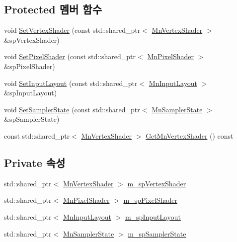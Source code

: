 \subsection*{Protected 멤버 함수}
\begin{DoxyCompactItemize}
\item 
void \hyperlink{class_m_n_l_1_1_mn_shader_path_ace035d94a5fccba00c4a52e48f5b26d2}{Set\+Vertex\+Shader} (const std\+::shared\+\_\+ptr$<$ \hyperlink{class_m_n_l_1_1_mn_vertex_shader}{Mn\+Vertex\+Shader} $>$ \&sp\+Vertex\+Shader)
\item 
void \hyperlink{class_m_n_l_1_1_mn_shader_path_a48f8dd4814bc4232d4f999502cf4fb98}{Set\+Pixel\+Shader} (const std\+::shared\+\_\+ptr$<$ \hyperlink{class_m_n_l_1_1_mn_pixel_shader}{Mn\+Pixel\+Shader} $>$ \&sp\+Pixel\+Shader)
\item 
void \hyperlink{class_m_n_l_1_1_mn_shader_path_a712673a10cf0eeba9ac5a3012aa2fb80}{Set\+Input\+Layout} (const std\+::shared\+\_\+ptr$<$ \hyperlink{class_m_n_l_1_1_mn_input_layout}{Mn\+Input\+Layout} $>$ \&sp\+Input\+Layout)
\item 
void \hyperlink{class_m_n_l_1_1_mn_shader_path_af646c4494b19a405efdae6fd6d4fad8c}{Set\+Sampler\+State} (const std\+::shared\+\_\+ptr$<$ \hyperlink{class_m_n_l_1_1_mn_sampler_state}{Mn\+Sampler\+State} $>$ \&sp\+Sampler\+State)
\item 
const std\+::shared\+\_\+ptr$<$ \hyperlink{class_m_n_l_1_1_mn_vertex_shader}{Mn\+Vertex\+Shader} $>$ \hyperlink{class_m_n_l_1_1_mn_shader_path_ab420805bf815e0b4d7910323ea3c08ad}{Get\+Mn\+Vertex\+Shader} () const
\end{DoxyCompactItemize}
\subsection*{Private 속성}
\begin{DoxyCompactItemize}
\item 
std\+::shared\+\_\+ptr$<$ \hyperlink{class_m_n_l_1_1_mn_vertex_shader}{Mn\+Vertex\+Shader} $>$ \hyperlink{class_m_n_l_1_1_mn_shader_path_a5cabf2617966090ed953812d48fb157d}{m\+\_\+sp\+Vertex\+Shader}
\item 
std\+::shared\+\_\+ptr$<$ \hyperlink{class_m_n_l_1_1_mn_pixel_shader}{Mn\+Pixel\+Shader} $>$ \hyperlink{class_m_n_l_1_1_mn_shader_path_a8881dffb70fdbfb969f1b7c3a043d5b8}{m\+\_\+sp\+Pixel\+Shader}
\item 
std\+::shared\+\_\+ptr$<$ \hyperlink{class_m_n_l_1_1_mn_input_layout}{Mn\+Input\+Layout} $>$ \hyperlink{class_m_n_l_1_1_mn_shader_path_ab1a5cabc3bc0c0a19e2dd074ba8e0eb1}{m\+\_\+sp\+Input\+Layout}
\item 
std\+::shared\+\_\+ptr$<$ \hyperlink{class_m_n_l_1_1_mn_sampler_state}{Mn\+Sampler\+State} $>$ \hyperlink{class_m_n_l_1_1_mn_shader_path_ad1dbaa261be8dcca3137133cd0f10ed5}{m\+\_\+sp\+Sampler\+State}
\end{DoxyCompactItemize}


